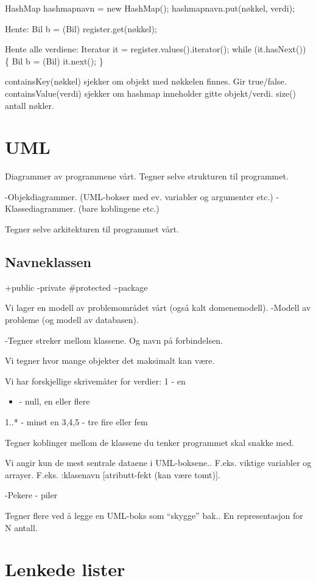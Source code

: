 \documentclass[11pt]{article}
\begin{document}
HashMap hashmapnavn = new HashMap();
hashmapnavn.put(nøkkel, verdi);

Hente: Bil b = (Bil) register.get(nøkkel);

Hente alle verdiene:
Iterator it = register.values().iterator();
while (it.hasNext()) \{
    Bil b = (Bil) it.next();
\}


containsKey(nøkkel) sjekker om objekt med nøkkelen finnes. Gir
true/false.
containsValue(verdi) sjekker om hashmap inneholder gitte objekt/verdi.
size() antall nøkler.
\section{UML}
\label{sec-7}


Diagrammer av programmene vårt.
Tegner selve strukturen til programmet.

-Objekdiagrammer. (UML-bokser med ev. variabler og argumenter etc.)
-Klassediagrammer. (bare koblingene etc.)

Tegner selve arkitekturen til programmet vårt. 
\subsection{Navneklassen}
\label{sec-7-1}


+public
-private
\#protected
\~{}package

Vi lager en modell av problemområdet vårt (også kalt domenemodell).
-Modell av probleme (og modell av databasen).

-Tegner streker mellom klassene. Og navn på forbindelsen.

Vi tegner hvor mange objekter det maksimalt kan være.

Vi har forskjellige skrivemåter for verdier:
1 - en
\begin{itemize}
\item -  null, en eller flere
\end{itemize}
1..* - minst en
3,4,5 - tre fire eller fem

Tegner koblinger mellom de klassene du tenker programmet skal snakke
med.

Vi angir kun de mest sentrale dataene i UML-boksene.. F.eks. viktige
variabler og arrayer.
F.eks. :klasenavn [atributt-fekt (kan være tomt)].

-Pekere - piler

Tegner flere ved å legge en UML-boks som ``skygge'' bak.. En
representasjon for N antall.
\section{Lenkede lister}
\label{sec-8}
\end{document}
